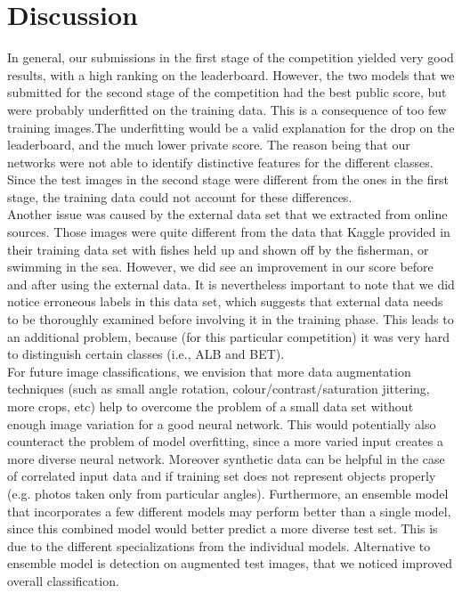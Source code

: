 \documentclass[a4paper]{article}
\begin{document}
\section{Discussion}

In general, our submissions in the first stage of the competition yielded very good results, with a high ranking on the leaderboard. However, the two models that we submitted for the second stage of the competition had the best public score, but were probably underfitted on the training data. This is a consequence of too few training images.The underfitting would be a valid explanation for the drop on the leaderboard, and the much lower private score. The reason being that our networks were not able to identify distinctive features for the different classes. Since the test images in the second stage were different from the ones in the first stage, the training data could not account for these differences.\\

Another issue was caused by the external data set that we extracted from online sources. Those images were quite different from the data that Kaggle provided in their training data set with fishes held up and shown off by the fisherman, or swimming in the sea. However, we did see an improvement in our score before and after using the external data. It is nevertheless important to note that we did notice erroneous labels in this data set, which suggests that external data needs to be thoroughly examined before involving it in the training phase. This leads to an additional problem, because (for this particular competition) it was very hard to distinguish certain classes (i.e., ALB and BET).\\ 

For future image classifications, we envision that more data augmentation techniques (such as small angle rotation, colour/contrast/saturation jittering, more crops, etc) help to overcome the problem of a small data set without enough image variation for a good neural network. This would potentially also counteract the problem of model overfitting, since a more varied input creates a more diverse neural network. Moreover synthetic data can be helpful in the case of correlated input data and if training set does not represent objects properly (e.g. photos taken only from particular angles). Furthermore, an ensemble model that incorporates a few different models may perform better than a single model, since this combined model would better predict a more diverse test set. This is due to the different specializations from the individual models. Alternative to ensemble model is detection on augmented test images, that we noticed improved overall classification. 
\end{document}
